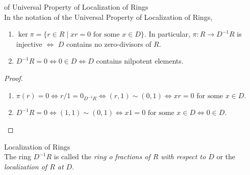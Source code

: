 \begin{corollary}{of Universal Property of Localization of Rings}\\
In the notation of the Universal Property of Localization of Rings,
\begin{enumerate}
    \item $\ker \pi= \{r\in R\mid xr=0 \text{ for some } x\in D\}$. In particular, $\pi: R\to D^{-1}R$ is injective $\Leftrightarrow$ $D$ contains no zero-divisors of $R$.
    \item $D^{-1}R=0 \Leftrightarrow 0\in D \Leftrightarrow D$ contains nilpotent elements.
\end{enumerate}
\end{corollary}

\begin{proof}
    \begin{enumerate}
        \item $\pi(r)=0 \Leftrightarrow r/1=0_{D^{-1}R} \Leftrightarrow (r,1) \sim (0,1) \Leftrightarrow xr=0 \text{ for some } x\in D$.
        \item $D^{-1}R=0 \Leftrightarrow (1,1) \sim (0,1) \Leftrightarrow x1=0 \text{ for some }x \in D \Leftrightarrow 0\in D$.
    \end{enumerate}
\end{proof}

\begin{definition}{Localization of Rings}\\
The ring $D^{-1}R$ is called the \textit{ring o fractions of $R$ with respect to $D$} or the \textit{localization of $R$ at $D$}.
\end{definition}

